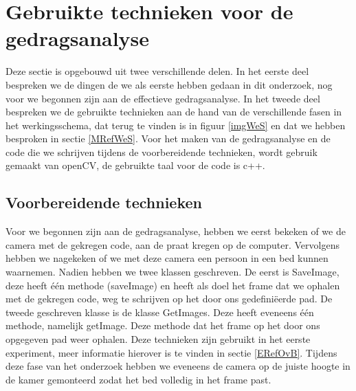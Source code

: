 \section{Gebruikte technieken voor de gedragsanalyse}
\label{MRefMGA}
Deze sectie is opgebouwd uit twee verschillende delen. In het eerste deel bespreken we de dingen de we als eerste hebben gedaan in dit onderzoek, nog voor we begonnen zijn aan de effectieve gedragsanalyse. In het tweede deel bespreken we de gebruikte technieken aan de hand van de verschillende fasen in het werkingsschema, dat terug te vinden is in figuur \ref{imgWeS} en dat we hebben besproken in sectie \ref{MRefWeS}. Voor het maken van de gedragsanalyse en de code die we schrijven tijdens de voorbereidende technieken, wordt gebruik gemaakt van openCV, de gebruikte taal voor de code is c++.

\subsection{Voorbereidende technieken}
Voor we begonnen zijn aan de gedragsanalyse, hebben we eerst bekeken of we de camera met de gekregen code, aan de praat kregen op de computer. Vervolgens hebben we nagekeken of we met deze camera een persoon in een bed kunnen waarnemen. Nadien hebben we twee klassen geschreven. De eerst is SaveImage, deze heeft \'e\'en methode (saveImage) en heeft als doel het frame dat we ophalen met de gekregen code, weg te schrijven op het door ons gedefini\"eerde pad. De tweede geschreven klasse is de klasse GetImages. Deze heeft eveneens \'e\'en methode, namelijk getImage. Deze methode dat het frame op het door ons opgegeven pad weer ophalen. Deze technieken zijn gebruikt in het eerste experiment, meer informatie hierover is te vinden in sectie \ref{ERefOvB}. Tijdens deze fase van het onderzoek hebben we eveneens de camera op de juiste hoogte in de kamer gemonteerd zodat het bed volledig in het frame past. 

